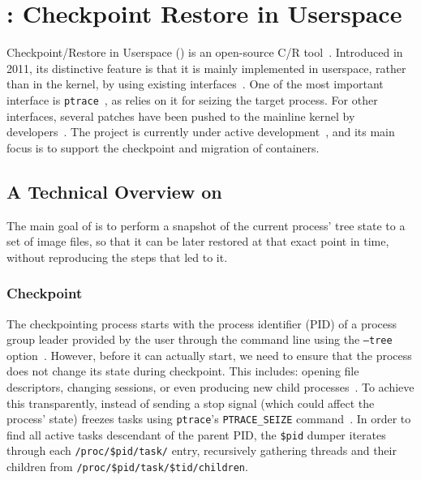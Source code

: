 \section{\criu: Checkpoint Restore in Userspace} \label{sec:bg-criu}

Checkpoint/Restore in Userspace (\criu) is an open-source C/R tool~\cite{criu-main-page}.
Introduced in 2011, its distinctive feature is that it is mainly implemented in userspace, rather than in the kernel, by using existing interfaces~\cite{Reber2016}.
One of the most important interface is \texttt{ptrace}~\cite{ptrace-manpage}, as \criu relies on it for seizing the target process.
For other interfaces, several patches have been pushed to the mainline kernel by \criu developers~\cite{criu-kernel-patches}.
The project is currently under active development~\cite{criu-github}, and its main focus is to support the checkpoint and migration of containers.

\subsection{A Technical Overview on \criu}

The main goal of \criu is to perform a snapshot of the current process' tree state to a set of image files, so that it can be later restored at that exact point in time, without reproducing the steps that led to it.

\subsubsection*{Checkpoint}

The checkpointing process starts with the process identifier (PID) of a process group leader provided by the user through the command line using the \texttt{--tree} option~\cite{criu-checkpoint}.
However, before it can actually start, we need to ensure that the process does not change its state during checkpoint.
This includes: opening file descriptors, changing sessions, or even producing new child processes~\cite{criu-freeze}.
To achieve this transparently, instead of sending a stop signal (which could affect the process' state) \criu freezes tasks using \texttt{ptrace}'s \texttt{PTRACE\_SEIZE} command~\cite{ptrace-manpage}.
In order to find all active tasks descendant of the parent PID, the \texttt{\$pid} dumper iterates through each \texttt{/proc/\$pid/task/} entry, recursively gathering threads and their children from \texttt{/proc/\$pid/task/\$tid/children}.

